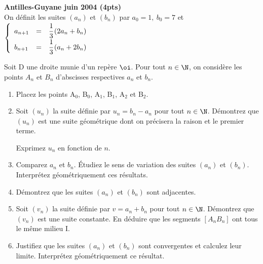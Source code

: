 \begin{exercice}
\noindent
{\large \textbf{\gray  Antilles-Guyane juin 2004 (4pts)}}\\
\noindent On d\'efinit les suites $\left(a_n\right)$ et $\left(b_n\right)$ par $a_0 =1,~ 
b_0 =7$ et $\left\{\begin{array}{l c l}
a_{n+1}& =&\cfrac{1}{3}\left(2a_n +b_n\right)\\
b_{n+1}& =&\cfrac{1}{3}\left(a_n +2b_n\right)\\
\end{array}\right.$

\noindent Soit D une droite munie d'un rep\`ere $\oi$. Pour tout $n \in \N$, on consid\`ere
 les points $A_n$ et $B_n$ d'abscisses respectives $a_n$ et $b_n$.

\begin{enumerate} \item Placez les points A$_0$, B$_0$, A$_1$, B$_1$, A$_2$ et B$_2$.

\item Soit $\left(u_n\right)$ la suite d\'efinie par $u_n = b_n - a_n$ pour 
tout $n \in \N$. D\'emontrez que $\left(u_n\right)$ est une
suite g\'eom\'etrique  dont on pr\'ecisera la raison et le premier terme.

\noindent Exprimez $u_n$ en fonction de $n$.

\item Comparez $a_n$ et $b_n$. \'Etudiez le sens de variation des suites $\left(a_n\right)$
 et $\left(b_n\right)$. Interpr\'etez g\'eom\'etriquement ces r\'esultats.

\item D\'emontrez que les suites $\left(a_n\right)$ et $\left(b_n\right)$ sont adjacentes.

\item Soit $\left(v_n\right)$ la suite d\'efinie par $v = a_n + b_n$ pour tout 
$n \in \N$.  D\'emontrez que $\left(v_n\right)$ est une suite constante. En d\'eduire
 que les segments $\left[A_nB_n\right]$ ont tous le m\^eme milieu I.

\item Justifiez que les suites $\left(a_n\right)$ et $\left(b_n\right)$ sont convergentes et 
calculez leur limite. Interpr\'etez g\'eom\'etriquement ce r\'esultat.

\end{enumerate}
 
\end{exercice}
